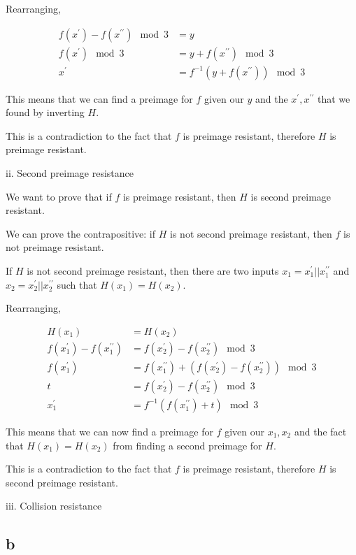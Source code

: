 \documentclass[11pt]{article}
\begin{document}
Rearranging,

\begin{align*}
    f(x^\prime) - f(x^{\prime\prime}) \mod 3 &= y \\
    f(x^\prime) \mod 3 &= y + f(x^{\prime\prime}) \mod 3 \\
    x^\prime &= f^{-1}(y + f(x^{\prime\prime})) \mod 3
\end{align*}

This means that we can find a preimage for $f$ given our $y$ and the $x^\prime, x^{\prime\prime}$ that we found by inverting $H$.

This is a contradiction to the fact that $f$ is preimage resistant, therefore $H$ is preimage resistant.

ii. Second preimage resistance

We want to prove that if $f$ is preimage resistant, then $H$ is second preimage resistant.

We can prove the contrapositive: if $H$ is not second preimage resistant, then $f$ is not preimage resistant.

If $H$ is not second preimage resistant, then there are two inputs $x_1 = x^\prime_1 || x^{\prime\prime}_1$ and $x_2 = x^\prime_2 || x^{\prime\prime}_2$ such that $H(x_1) = H(x_2)$.

Rearranging,

\begin{align*}
    H(x_1) &= H(x_2) \\
    f(x^\prime_1) - f(x^{\prime\prime}_1) &= f(x^\prime_2) - f(x^{\prime\prime}_2) \mod 3 \\
    f(x^\prime_1) &= f(x^{\prime\prime}_1) + (f(x^\prime_2) - f(x^{\prime\prime}_2)) \mod 3 \\
    t &= f(x^\prime_2) - f(x^{\prime\prime}_2) \mod 3 \\
    x^\prime_1 &= f^{-1}(f(x^{\prime\prime}_1) + t) \mod 3
\end{align*}

This means that we can now find a preimage for $f$ given our $x_1, x_2$ and the fact that $H(x_1) = H(x_2)$ from finding a second preimage for $H$.

This is a contradiction to the fact that $f$ is preimage resistant, therefore $H$ is second preimage resistant.

iii. Collision resistance

\subsection{b}
\end{document}
